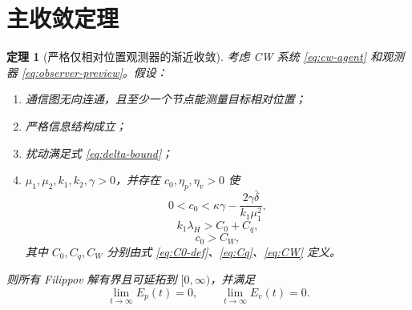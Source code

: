 \documentclass[UTF8,a4paper,12pt]{ctexart}
\newtheorem{theorem}{定理}
\begin{document}
\section{主收敛定理}

\begin{theorem}[严格仅相对位置观测器的渐近收敛]
\label{thm:poi-observer}
考虑 CW 系统 \eqref{eq:cw-agent} 和观测器 \eqref{eq:observer-preview}。假设：
\begin{enumerate}[label=(A\arabic*)]
  \item 通信图无向连通，且至少一个节点能测量目标相对位置；
  \item 严格信息结构成立；
  \item 扰动满足式 \eqref{eq:delta-bound}；
  \item $\mu_1,\mu_2,k_1,k_2,\gamma>0$，并存在 $c_0,\eta_p,\eta_v>0$ 使
  \begin{equation}
   0<c_0<\kappa\gamma-\frac{2\gamma\bar\delta}{k_1\mu_1^2},
  \label{eq:gain-1}
  \end{equation}
  \begin{equation}
   k_1\lambda_H>C_0+C_q,
  \label{eq:gain-2}
  \end{equation}
  \begin{equation}
   c_0>C_W,
  \label{eq:gain-3}
  \end{equation}
  其中 $C_0,C_q,C_W$ 分别由式 \eqref{eq:C0-def}、\eqref{eq:Cq}、\eqref{eq:CW} 定义。
\end{enumerate}
则所有 Filippov 解有界且可延拓到 $[0,\infty)$，并满足
\begin{equation}
 \lim_{t\to\infty}E_p(t)=0,\qquad
 \lim_{t\to\infty}E_v(t)=0.
\label{eq:main-convergence}
\end{equation}
\end{theorem}
\end{document}
